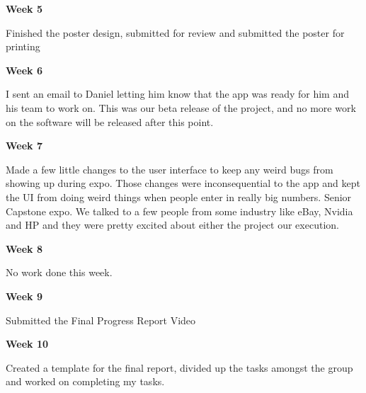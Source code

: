 \noindent\medskip\textbf{Week 5}

Finished the poster design, submitted for review and submitted the poster for printing

\noindent\medskip\textbf{Week 6}

I sent an email to Daniel letting him know that the app was ready for him and his team to work on.
This was our beta release of the project, and no more work on the software will be released after this point.

\noindent\medskip\textbf{Week 7}

Made a few little changes to the user interface to keep any weird bugs from showing up during expo.
Those changes were inconsequential to the app and kept the UI from doing weird things when people enter in really big numbers.
Senior Capstone expo.
We talked to a few people from some industry like eBay, Nvidia and HP and they were pretty excited about either the project our execution.

\noindent\medskip\textbf{Week 8}

No work done this week.

\noindent\medskip\textbf{Week 9}

Submitted the Final Progress Report Video

\noindent\medskip\textbf{Week 10}

Created a template for the final report, divided up the tasks amongst the group and worked on completing my tasks.
